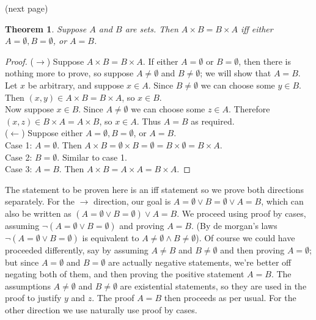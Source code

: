 \documentclass{report}
\newtheorem*{theorem}{Theorem}
\theoremstyle{definition}
\begin{document}
\noindent(next page)\newpage
\begin{theorem}
Suppose $A$ and $B$ are sets. Then $A\times B=B\times A$ iff either $A=\emptyset,B=\emptyset$, or $A=B$.
\end{theorem}
\begin{proof}
($\rightarrow$) Suppose $A\times B=B\times A$. If either $A=\emptyset$ or $B=\emptyset$, then there is nothing more to prove, so suppose $A\neq\emptyset$ and $B\neq\emptyset$;
we will show that $A=B$. Let $x$ be arbitrary, and suppose $x\in A$. Since $B\neq\emptyset$ we can choose some $y\in B$. Then $(x,y)\in A\times B=B\times A$, so $x\in B$.\\
\indent Now suppose $x\in B$. Since $A\neq\emptyset$ we can choose some $z\in A$. Therefore $(x,z)\in B\times A=A\times B$, so $x\in A$. Thus $A=B$ as required.\\
\indent($\leftarrow$) Suppose either $A=\emptyset,B=\emptyset$, or $A=B$.\\
Case 1: $A=\emptyset$. Then $A\times B=\emptyset\times B=\emptyset=B\times\emptyset=B\times A$.\\
Case 2: $B=\emptyset$. Similar to case 1.\\
Case 3: $A=B$. Then $A\times B=A\times A=B\times A$.
\end{proof}
\noindent The statement to be proven here is an iff statement so we prove both directions separately. For the $\rightarrow$ direction, our goal is $A=\emptyset\lor B=\emptyset\lor A=B$, which can
also be written as $(A=\emptyset\lor B=\emptyset)\lor A=B$.
We proceed using proof by cases, assuming $\neg(A=\emptyset\lor B=\emptyset)$ and proving $A=B$.
(By de morgan's laws $\neg(A=\emptyset\lor B=\emptyset)$ is equivalent to $A\neq\emptyset\land B\neq\emptyset$). Of course we could have proceeded differently, say by assuming 
$A\neq B$ and $B\neq\emptyset$ and then proving $A=\emptyset$; but since $A=\emptyset$ and $B=\emptyset$ are actually negative statements, we're better off negating both of them, and then 
proving the positive statement $A=B$. The assumptions $A\neq\emptyset$ and $B\neq\emptyset$ are existential statements, so they are used in the proof to justify $y$ and $z$. The proof $A=B$ then
proceeds as per usual. For the other direction we use naturally use proof by cases.
\newpage
\end{document}
